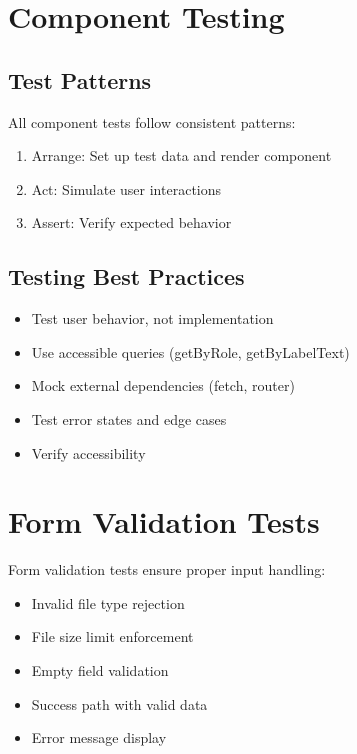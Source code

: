 \documentclass[12pt,a4paper]{report}
\begin{document}
\section{Component Testing}

\subsection{Test Patterns}

All component tests follow consistent patterns:

\begin{enumerate}
    \item Arrange: Set up test data and render component
    \item Act: Simulate user interactions
    \item Assert: Verify expected behavior
\end{enumerate}

\subsection{Testing Best Practices}

\begin{itemize}
    \item Test user behavior, not implementation
    \item Use accessible queries (getByRole, getByLabelText)
    \item Mock external dependencies (fetch, router)
    \item Test error states and edge cases
    \item Verify accessibility
\end{itemize}

\section{Form Validation Tests}

Form validation tests ensure proper input handling:

\begin{itemize}
    \item Invalid file type rejection
    \item File size limit enforcement
    \item Empty field validation
    \item Success path with valid data
    \item Error message display
\end{itemize}
\end{document}
